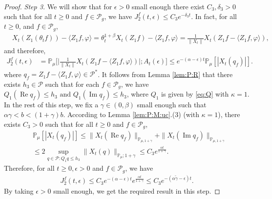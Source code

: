 \documentclass[12pt,a4paper]{amsart}
\theoremstyle{plain}
\theoremstyle{definition}
\numberwithin{equation}{section}
\begin{document}
\begin{proof}
\emph{Step 3.}
We will show that for $\epsilon>0$ small enough there exist $C_3, \delta_3 > 0$ such that for all $t \geq 0$ and $f\in \mathcal P_g$,  we have $ J^f_2(t,\epsilon) \leq C_3 e^{-\delta_3 t}$.
In fact, for all $t\geq 0$, and $f\in \mathcal P_g$,
\begin{align}
  & X_{t}(Z_1(\theta_t f))- \langle Z_1f, \varphi\rangle
     = \theta_t^{1+\beta} X_t(Z_1 f) - \langle  Z_1 f,\varphi \rangle
     = \frac{1}{\|X_{t}\|}X_t(Z_1f - \langle  Z_1 f ,\varphi \rangle),
\end{align}
and therefore,
\begin{align}
  \label{eq: prevJ2}
  J^f_2(t,\epsilon)
  & = \mathbb P_\mu\Big[\Big|  \frac{1}{\|X_{t}\|}X_t(Z_1f - \langle  Z_1 f ,\varphi \rangle) \Big|;A_t(\epsilon)\Big]
    \leq e^{-(\alpha-\epsilon)t} \mathbb{P}_{\mu}[|X_t (q_f) |].
\end{align}
where $ q_f = Z_1 f-\langle  Z_1 f,\varphi\rangle \in \mathcal P^*$.
It follows from Lemma \ref{lem:P:R} that there exists $h_{3}\in \mathcal{P}$ such that for each $ f\in \mathcal P_g$, we have $Q_1 (\operatorname{Re} q_f) \leq h_{3} \text{ and } Q_1 (\operatorname{Im} q_f)\leq h_3$, where $Q_1$ is given by \eqref{eq:Q} with $\kappa=1$.
In the rest of this step, we  fix a $\gamma\in(0,\beta)$ small enough such that $\alpha \gamma < b < (1+\gamma)b$.
According to Lemma \ref{lem:P:M:uc}.(3) (with $\kappa=1$), there exists $C_{3}>0$ such that for all $t\geq 0$ and $f\in \mathcal P_g$,
\begin{align}
  & \mathbb{P}_{\mu}\left[\left|X_{t}(q_f)\right|\right]
    \leq \| X_{t}( \operatorname{Re} q_f)\|_{\mathbb{P}_{\mu,1+\gamma}} + \| X_{t}(\operatorname{Im} q_f)\|_{\mathbb{P}_{\mu,1+\gamma}} \\
 & \leq 2\sup_{q\in \mathcal P: Q_1 q\leq h_{3}} \|X_t(q)\|_{\mathbb P_\mu; 1+\gamma} \leq C_{3} e^{\frac{\alpha t}{1+\gamma}}.
\end{align}
Therefore, for all $t\geq 0, \epsilon > 0$ and $f \in \mathcal P_g$, we have
\begin{align}
  \label{eq: right bound for J2}
   J^f_2(t, \epsilon)
    \leq  C_3 e^{-(\alpha-\epsilon)t}e^{\frac{\alpha t}{1+\gamma}}
   \leq C_{3} e^{-(\alpha\tilde \gamma -\epsilon)t}.
\end{align}
By taking $\epsilon >0$ small enough, we get the required result in this step.


\end{proof}
\end{document}
